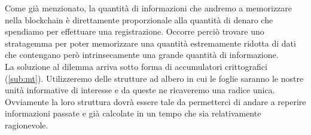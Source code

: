 Come già menzionato, la quantità di informazioni che andremo a memorizzare
nella blockchain è direttamente proporzionale alla quantità di denaro che
spendiamo per effettuare una registrazione.
Occorre perciò trovare uno stratagemma per poter memorizzare una quantità
estremamente ridotta di dati che contengano però intrinsecamente una grande
quantità di informazione. \\
La soluzione al dilemma arriva sotto forma di accumulatori crittografici (\autoref{sub:mt}).
Utilizzeremo delle strutture ad albero in cui le foglie saranno le nostre unità
informative di interesse e da queste ne ricaveremo una radice unica.
Ovviamente la loro struttura dovrà essere tale da permetterci di andare a reperire
informazioni passate e già calcolate in un tempo che sia relativamente ragionevole.

\newpage